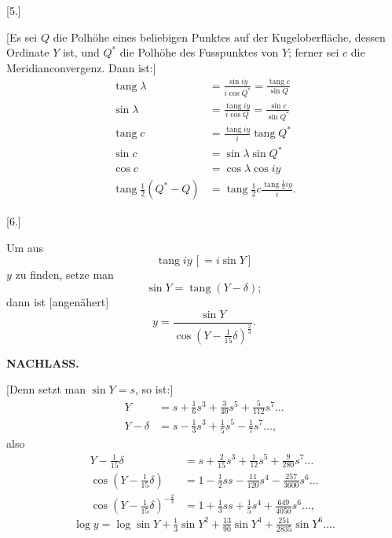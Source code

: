 \begin{center}[5.]\end{center}
[Es sei \(Q\) die Polhöhe eines beliebigen Punktes auf der Kugeloberfläche,
dessen Ordinate \(Y\) ist, und \(Q^{*}\) die Polhöhe des Fusspunktes von \(Y\);
ferner sei \(c\) die Meridianconvergenz. Dann ist:]
\[
\begin{aligned}
\operatorname{tang}\lambda&=\frac{\sin iy}{i\cos Q^{*}}=\frac{\operatorname{tang}c}{\sin Q}\\
\sin\lambda&=\frac{\operatorname{tang}iy}{i\cos Q}=\frac{\sin c}{\sin Q^{*}}\\
\operatorname{tang}c&=\frac{\operatorname{tang}iy}{i}\operatorname{tang} Q^{*}\\
\sin c&=\sin\lambda\sin Q^{*}\\
\cos c&=\cos\lambda\cos iy\\
\operatorname{tang}\tfrac12(Q^{*}-Q)&=\operatorname{tang}\tfrac12c
 \frac{\operatorname{tang}\tfrac12iy}{i}.
\end{aligned}
\]

\begin{center}[6.]\end{center}
Um aus
\[
\operatorname{tang}iy\,[=i\sin Y]
\]
\noindent \(y\) zu finden, setze man
\[
\sin Y=\operatorname{tang}(Y-\delta);
\]
\noindent dann ist [angenähert]
\[
y=\frac{\sin Y}{\cos(Y-\tfrac1{15}\delta)^{\frac23}}.
\]

\par\clearpage
\noindent{}\hfill{\small\textbf{NACHLASS.}}\hfill\null\par\medskip

[Denn setzt man \(\sin Y=s\), so ist:]
\[
\begin{aligned}
Y&=s+\tfrac16s^3+\tfrac3{40}s^5+\tfrac5{112}s^7\ldots\\
Y-\delta&=s-\tfrac13s^3+\tfrac15s^5-\tfrac17s^7\ldots,
\end{aligned}
\]
\noindent also
\[
\begin{aligned}
Y-\tfrac1{15}\delta&=s+\tfrac2{15}s^3+\tfrac1{12}s^5+\tfrac9{280}s^7\ldots\\
\cos(Y-\tfrac1{15}\delta)&=1-\tfrac12ss-\tfrac{11}{120}s^4-\tfrac{257}{3600}s^6\ldots\\
\cos(Y-\tfrac1{15}\delta)^{-\frac23}&=1+\tfrac13ss+\tfrac15s^4+\tfrac{649}{4050}s^6\ldots,
\end{aligned}
\]
\[
\log y=\log\sin Y+\tfrac13\sin Y^2+\tfrac{13}{90}\sin Y^4+
 \tfrac{251}{2835}\sin Y^6\ldots.
\]

